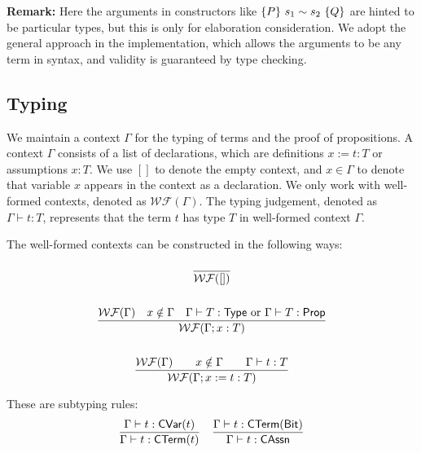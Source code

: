 \textbf{Remark:} Here the arguments in constructors like $\{P\}~s_1 \sim s_2~\{Q\}$ are hinted to be particular types, but this is only for elaboration consideration. We adopt the general approach in the implementation, which allows the arguments to be any term in syntax, and validity is guaranteed by type checking.


\subsection{Typing}

\newcommand{\WF}[1]{\ensuremath{\mathcal{WF}(#1)}}

We maintain a context $\Gamma$ for the typing of terms and the proof of propositions. 
A context $\Gamma$ consists of a list of declarations, which are definitions $x := t : T$ or assumptions $x : T$. 
We use $[]$ to denote the empty context, and $x \in \Gamma$ to denote that variable $x$ appears in the context as a declaration.
We only work with well-formed contexts, denoted as \WF{\Gamma}. 
The typing judgement, denoted as $\Gamma \vdash t : T$, represents that the term $t$ has type $T$ in well-formed context $\Gamma$. 


The well-formed contexts can be constructed in the following ways:

\begin{gather*}
    \frac{}{\WF{[]}} \\
    \\
    \frac{\WF{\Gamma} \quad x \notin \Gamma \quad \Gamma \vdash T : \Type \text{ or } \Gamma \vdash T : \prop}{\WF{\Gamma;x:T}} \\
    \\
    \frac{\WF{\Gamma} \qquad x \notin \Gamma \qquad \Gamma \vdash t : T}{\WF{\Gamma;x := t : T}} \\
\end{gather*}

These are subtyping rules:
\begin{gather*}
    \frac{\Gamma \vdash t : \textsf{CVar}(t)}{\Gamma \vdash t : \textsf{CTerm}(t)}
    \quad
    \frac{\Gamma \vdash t : \textsf{CTerm}(\textsf{Bit})}{\Gamma \vdash t : \textsf{CAssn}}
\end{gather*}


